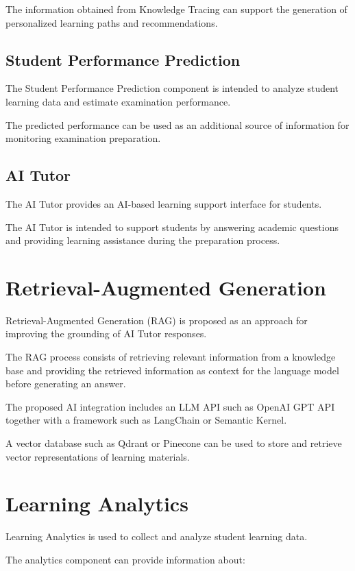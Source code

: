 The information obtained from Knowledge Tracing can support the generation of personalized learning paths and recommendations.

\subsection{Student Performance Prediction}

The Student Performance Prediction component is intended to analyze student learning data and estimate examination performance.

The predicted performance can be used as an additional source of information for monitoring examination preparation.

\subsection{AI Tutor}

The AI Tutor provides an AI-based learning support interface for students.

The AI Tutor is intended to support students by answering academic questions and providing learning assistance during the preparation process.

\section{Retrieval-Augmented Generation}

Retrieval-Augmented Generation (RAG) is proposed as an approach for improving the grounding of AI Tutor responses.

The RAG process consists of retrieving relevant information from a knowledge base and providing the retrieved information as context for the language model before generating an answer.

The proposed AI integration includes an LLM API such as OpenAI GPT API together with a framework such as LangChain or Semantic Kernel.

A vector database such as Qdrant or Pinecone can be used to store and retrieve vector representations of learning materials.

\section{Learning Analytics}

Learning Analytics is used to collect and analyze student learning data.

The analytics component can provide information about:

